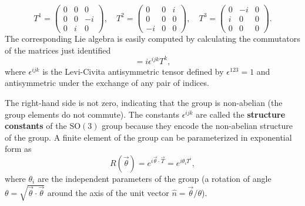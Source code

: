 \begin{equation}
    T^1 =
    \begin{pmatrix}
        0 & 0 & 0  \\
        0 & 0 & -i \\
        0 & i & 0
    \end{pmatrix}, \quad
    T^2 =
    \begin{pmatrix}
        0  & 0 & i \\
        0  & 0 & 0 \\
        -i & 0 & 0
    \end{pmatrix}, \quad
    T^3 =
    \begin{pmatrix}
        0 & -i & 0 \\
        i & 0  & 0 \\
        0 & 0  & 0
    \end{pmatrix}.
    \label{eq:SO3_generators}
\end{equation}
The corresponding Lie algebra is easily computed by calculating the commutators of the matrices just identified
\begin{equation}
    [T^i, T^j] = i \epsilon^{ijk} T^k,
    \label{eq:SO3_Lie_algebra}
\end{equation}
where $\epsilon^{ijk}$ is the Levi-Civita antisymmetric tensor defined by $\epsilon^{123} = 1$ and antisymmetric under the exchange of any pair of indices.

The right-hand side is not zero, indicating that the group is non-abelian (the group elements do not commute). The constants $\epsilon^{ijk}$ are called the \textbf{structure constants} of the $\mathrm{SO}(3)$ group because they encode the non-abelian structure of the group. A finite element of the group can be parameterized in exponential form as
\begin{equation}
    R(\vec{\theta}) = e^{i \vec{\theta} \cdot \vec{T}} = e^{i \theta_i T^i},
    \label{eq:SO3_exponential_map}
\end{equation}
where $\theta_i$ are the independent parameters of the group (a rotation of angle $\theta = \sqrt{\vec{\theta} \cdot \vec{\theta}}$ around the axis of the unit vector $\hat{n} = \vec{\theta}/\theta$).

